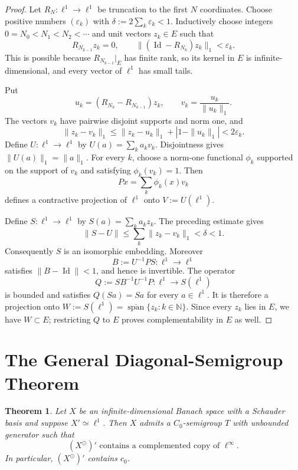 \documentclass[11pt]{article}
\newtheorem{theorem}{Theorem}
\newcommand{\N}{\mathbb N}
\newcommand{\Id}{\operatorname{Id}}
\newcommand{\cspan}{\overline{\operatorname{span}}}
\newcommand{\ellone}{\ell^{1}}
\newcommand{\ellinf}{\ell^{\infty}}
\begin{document}
\begin{proof}
Let \(R_N:\ellone\to\ellone\) be truncation to the first \(N\) coordinates.
Choose positive numbers \((\varepsilon_k)\) with
\(\delta:=2\sum_k\varepsilon_k<1\).  Inductively choose integers
\(0=N_0<N_1<N_2<\cdots\) and unit vectors \(z_k\in E\) such that
\[
 R_{N_{k-1}}z_k=0,
 \qquad
 \|(\Id-R_{N_k})z_k\|_1<\varepsilon_k.
\]
This is possible because \(R_{N_{k-1}}|_E\) has finite rank, so its kernel in
\(E\) is infinite-dimensional, and every vector of \(\ellone\) has small
tails.

Put
\[
 u_k=(R_{N_k}-R_{N_{k-1}})z_k,
 \qquad v_k=\frac{u_k}{\|u_k\|_1}.
\]
The vectors \(v_k\) have pairwise disjoint supports and norm one, and
\[
 \|z_k-v_k\|_1
 \leq \|z_k-u_k\|_1+|1-\|u_k\|_1|
 <2\varepsilon_k.
\]
Define \(U:\ellone\to\ellone\) by
\(U(a)=\sum_k a_kv_k\).  Disjointness gives \(\|U(a)\|_1=\|a\|_1\).
For every \(k\), choose a norm-one functional \(\phi_k\) supported on the
support of \(v_k\) and satisfying \(\phi_k(v_k)=1\).  Then
\[
 P x=\sum_k\phi_k(x)v_k
\]
defines a contractive projection of \(\ellone\) onto
\(V:=U(\ellone)\).

Define \(S:\ellone\to\ellone\) by \(S(a)=\sum_k a_kz_k\).  The preceding
estimate gives
\[
 \|S-U\|\leq\sum_k\|z_k-v_k\|_1<\delta<1.
\]
Consequently \(S\) is an isomorphic embedding.  Moreover
\[
 B:=U^{-1}PS:\ellone\to\ellone
\]
satisfies \(\|B-\Id\|<1\), and hence is invertible.  The operator
\[
 Q:=SB^{-1}U^{-1}P:\ellone\longrightarrow S(\ellone)
\]
is bounded and satisfies \(Q(Sa)=Sa\) for every \(a\in\ellone\).  It is
therefore a projection onto
\(W:=S(\ellone)=\cspan\{z_k:k\in\N\}\).  Since every \(z_k\) lies in \(E\),
we have \(W\subset E\); restricting \(Q\) to \(E\) proves complementability in
\(E\) as well.
\end{proof}

\section*{The General Diagonal-Semigroup Theorem}

\begin{theorem}
\label{thm:general}
Let \(X\) be an infinite-dimensional Banach space with a Schauder basis and
suppose \(X'\simeq\ellone\).  Then \(X\) admits a \(C_0\)-semigroup \(T\) with
unbounded generator such that
\[
  (X^\odot)'\text{ contains a complemented copy of }\ellinf.
\]
In particular, \((X^\odot)'\) contains \(c_0\).
\end{theorem}
\end{document}
